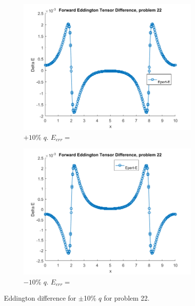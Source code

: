 \documentclass{article}
\begin{document}
\begin{figure}[H]
\centering
\begin{subfigure}{.5\textwidth}
  \centering
  \includegraphics[width=1\linewidth]{p22deltaEdq.png}
  \caption{$+10\%$ $q$. $E_{err}=$}
  \label{fig:sub1}
\end{subfigure}%
\begin{subfigure}{.5\textwidth}
  \centering
  \includegraphics[width=1\linewidth]{p22deltaEdq-10.png}
  \caption{$-10\%$ $q$. $E_{err}=$}
  \label{fig:sub2}
\end{subfigure}
\caption{Eddington difference for $\pm$10$\%$ $q$ for problem 22.}
\label{fig:test}
\end{figure}
\end{document}
